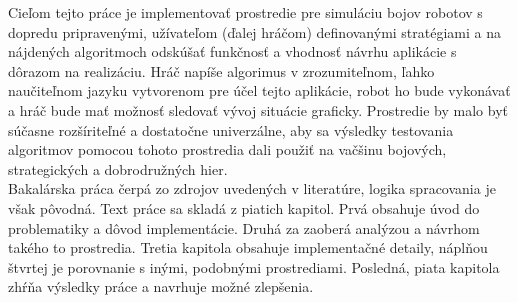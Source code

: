 \indent Cieľom tejto práce je implementovať prostredie pre simuláciu bojov robotov s dopredu pripravenými, užívateľom (ďalej hráčom) definovanými stratégiami a na nájdených algoritmoch odskúšať funkčnosť a vhodnosť návrhu aplikácie s dôrazom na realizáciu. Hráč napíše algorimus v zrozumiteľnom, ľahko naučiteľnom jazyku vytvorenom pre účel tejto aplikácie, robot ho bude vykonávať a hráč bude mať možnosť sledovať vývoj situácie graficky.
\indent Prostredie by malo byť súčasne rozšíriteľné a dostatočne univerzálne, aby sa výsledky testovania algoritmov pomocou tohoto prostredia dali použiť na vačšinu bojových, strategických a dobrodružných hier. \\
\indent Bakalárska práca čerpá zo zdrojov uvedených v literatúre, logika spracovania je však pôvodná. Text práce sa skladá z piatich kapitol. Prvá obsahuje úvod do problematiky a dôvod implementácie. Druhá za zaoberá analýzou a návrhom takého to prostredia. Tretia kapitola obsahuje implementačné detaily, náplňou štvrtej je porovnanie s inými, podobnými prostrediami. Posledná, piata kapitola zhŕňa výsledky práce a navrhuje možné zlepšenia.

